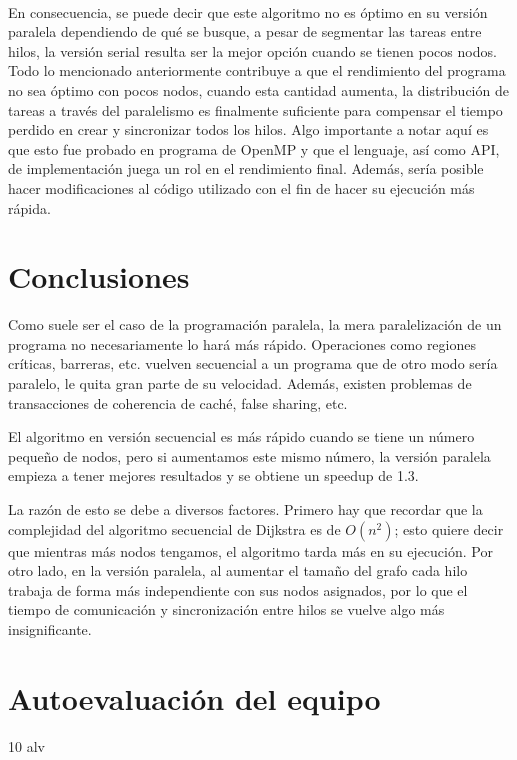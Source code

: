 \documentclass[11pt]{article}
\begin{document}
\paragraph{}
En consecuencia, se puede decir que este algoritmo no es óptimo en su versión paralela dependiendo de qué se busque, a pesar de segmentar las tareas entre hilos, la versión serial resulta ser la mejor opción cuando se tienen pocos nodos. Todo lo mencionado anteriormente contribuye a que el rendimiento del programa no sea óptimo con pocos nodos, cuando esta cantidad aumenta, la distribución de tareas a través del paralelismo es finalmente suficiente para compensar el tiempo perdido en crear y sincronizar todos los hilos. Algo importante a notar aquí es que esto fue probado en programa de OpenMP y que el lenguaje, así como API, de implementación juega un rol en el rendimiento final. Además, sería posible hacer modificaciones al código utilizado con el fin de hacer su ejecución más rápida.

\section{Conclusiones}
Como suele ser el caso de la programación paralela, la mera paralelización de un programa no necesariamente lo hará más rápido. Operaciones como regiones críticas, barreras, etc. vuelven secuencial a un programa que de otro modo sería paralelo, le quita gran parte de su velocidad. Además, existen problemas de transacciones de coherencia de caché, false sharing, etc.
\par
El algoritmo en versión secuencial es más rápido cuando se tiene un número pequeño de nodos, pero si aumentamos este mismo número, la versión paralela empieza a tener mejores resultados y se obtiene un speedup de 1.3.
\par
La razón de esto se debe a diversos factores. Primero hay que recordar que la complejidad del algoritmo secuencial de Dijkstra es de $O(n^2)$; esto quiere decir que mientras más nodos tengamos, el algoritmo tarda más en su ejecución. Por otro lado, en la versión paralela, al aumentar el tamaño del grafo cada hilo trabaja de forma más independiente con sus nodos asignados, por lo que el tiempo de comunicación y sincronización entre hilos se vuelve algo más insignificante. 

\section{Autoevaluación del equipo}
10 alv
\end{document}
